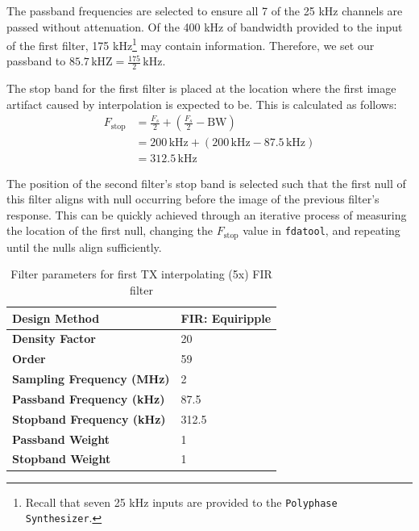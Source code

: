 The passband frequencies are selected to ensure all 7 of the 25 kHz channels
are passed without attenuation. Of the 400 kHz of bandwidth provided to the
input of the first filter, 175 kHz\footnote{Recall that seven 25 kHz inputs
are provided to the \texttt{Polyphase Synthesizer}.} may contain information.
Therefore, we set our passband to $85.7 \, \text{kHZ} = \frac{175}{2}
\,\text{kHz}$.

The stop band for the first filter is placed at the location where the first
image artifact caused by interpolation is expected to be. This is calculated as
follows:
\begin{align*}
  F_{\text{stop}} &= \frac{F_s}{2} + \left( \frac{F_s}{2} - \text{BW} \right) \\
  &= 200 \,\text{kHz} + \left( 200 \,\text{kHz} - 87.5 \,\text{kHz} \right) \\
  &= 312.5 \,\text{kHz}
\end{align*}

The position of the second filter's stop band is selected such that the first
null of this filter aligns with null occurring before the image of the previous
filter's response. This can be quickly achieved through an iterative process of
measuring the location of the first null, changing the $F_{\text{stop}}$ value
in \texttt{fdatool}, and repeating until the nulls align sufficiently.

\begin{table}[h]
  \centering
  \caption{Filter parameters for first TX interpolating (5x) FIR filter}
  \label{tab:tx_interp_fir1}
  \footnotesize
  \begin{tabular} {|l|l|}
    \hline
    \textbf{Design Method}              & FIR: Equiripple \\ \hline
    \textbf{Density Factor}             & 20              \\ \hline
    \textbf{Order}                      & 59              \\ \hline
    \textbf{Sampling Frequency (MHz)}   & 2               \\ \hline
    \textbf{Passband Frequency (kHz)}   & 87.5            \\ \hline
    \textbf{Stopband Frequency (kHz)}   & 312.5           \\ \hline
    \textbf{Passband Weight}            & 1               \\ \hline
    \textbf{Stopband Weight}            & 1               \\ \hline
  \end{tabular}
\end{table}

